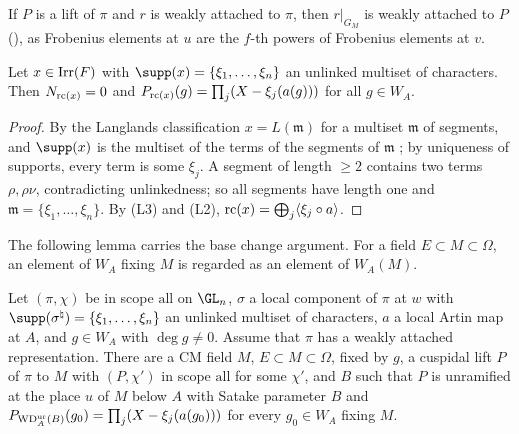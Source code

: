 If $P$ is a lift of $\pi$ and $r$ is weakly attached to $\pi$, then $r|_{G_M}$ is weakly attached to $P$
(), as Frobenius elements at $u$ are the $f$-th powers of Frobenius
elements at $v$.

\begin{lemma}\label{pf:galred:rcchars}
Let $x\in\operatorname{Irr}(F)$ with $\supp(x)=\{\xi_1,\dots,\xi_n\}$ an unlinked multiset of characters. Then
$N_{\mathrm{rc}(x)}=0$ and $P_{\mathrm{rc}(x)}(g)=\prod_j(X-\xi_j(a(g)))$ for all $g\in W_A$.
\end{lemma}

\begin{proof}
By the Langlands classification $x=L(\mathfrak m)$ for a multiset $\mathfrak m$ of segments, and $\supp(x)$ is the
multiset of the terms of the segments of $\mathfrak m$ \cite{Zelevinsky1980}; by uniqueness of supports, every term is
some $\xi_j$. A segment of length $\ge2$ contains two terms $\rho,\rho\nu$, contradicting unlinkedness; so all
segments have length one and $\mathfrak m=\{\xi_1,\dots,\xi_n\}$. By (L3) and (L2),
$\mathrm{rc}(x)=\bigoplus_j\langle\xi_j\circ a\rangle$.
\end{proof}

The following lemma carries the base change argument. For a field $E\subset M\subset\Omega$, an element of $W_A$ fixing
$M$ is regarded as an element of $W_A(M)$.

\begin{lemma}\label{pf:galred:sphlift}
Let $(\pi,\chi)$ be in scope $\mathrm{all}$ on $\GL_n$, $\sigma$ a local component of $\pi$ at $w$ with
$\supp(\sigma^\natural)=\{\xi_1,\dots,\xi_n\}$ an unlinked multiset of characters, $a$ a local Artin map at $A$, and
$g\in W_A$ with $\deg g\ne0$. Assume that $\pi$ has a weakly attached representation. There are a CM field $M$, $E\subset
M\subset\Omega$, fixed by $g$, a cuspidal lift $P$ of $\pi$ to $M$ with $(P,\chi')$ in scope $\mathrm{all}$ for some
$\chi'$, and $B$ such that $P$ is unramified at the place $u$ of $M$ below $A$ with Satake parameter $B$ and
$P_{\mathrm{WD}^{\mathrm{ur}}_A(B)}(g_0)=\prod_j(X-\xi_j(a(g_0)))$ for every $g_0\in W_A$ fixing $M$.
\end{lemma}

